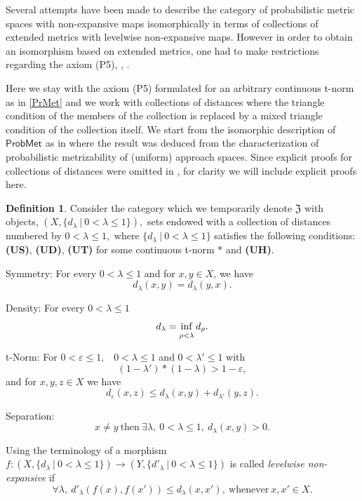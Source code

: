 \documentclass[12pt,a4paper]{amsart}
\theoremstyle{theorem}
\theoremstyle{definition}
\newtheorem{definition}[theorem]{Definition}
\newcommand{\PM}{\ensuremath{\mathsf{ProbMet_{}}}}
\renewcommand{\inf}{\myinf}
\DeclareMathOperator*{\myinf}{in\vphantom{p}f}
\newcommand{\ve}{\ensuremath{\varepsilon}}
\renewcommand{\l}{\ensuremath{\lambda}}
\def\rw{\rightarrow}
\begin{document}
{Several attempts have been made to describe the category of probabilistic metric spaces with non-expansive maps isomorphically in terms of collections of extended metrics with levelwise non-expansive maps.  However in order to obtain an isomorphism based on extended metrics, one had to make restrictions regarding the axiom (P5), \cite{SS}, \cite{N}.

Here we stay with the axiom (P5) formulated for an arbitrary continuous t-norm as in \eqref{PrMet} and we work with collections of distances where the triangle condition of the members of the collection is replaced by a mixed triangle condition of the 
collection itself. 
We start from the isomorphic description of $\PM$ as in \cite{CL2} where the result was deduced from the characterization of probabilistic metrizability of (uniform) approach spaces. Since explicit proofs for collections of distances were omitted in \cite{CL2}, for clarity we will include explicit proofs here.


\begin{definition}\label{Z}
Consider the category which we temporarily denote $\mathfrak{Z}$ with objects, $(X, \{d_\l \ | \ 0< \l \leq 1\}),$ sets endowed with a collection of distances numbered by $ 0< \l \leq 1,$ where $\{d_\l \ | \ 0< \l \leq 1\}$
satisfies the following conditions: {\bf(US)}, {\bf(UD)}, {\bf(UT)}  for some continuous t-norm $*$  and {\bf(UH)}.\\

\item [{\bf(US)}] Symmetry: For every $0 < \l \leq 1$ and for $x,y \in X$, we have 
$$d_\l (x, y) = d_\l (y, x).$$
\item [{\bf(UD)}] Density:  For every $0 < \l \leq 1$ 
$$
d_\l = \inf _{\rho < \l} d_\rho.
$$ 
\item[{\bf(UT)}] t-Norm: For $0< \ve \leq 1,$ \ $0 < \l \leq 1$ and $0 < \l' \leq 1$ with 
$$
 (1 - \l') * ( 1 - \l) > 1 - \ve,
$$
 and for $x,y,z \in X$ we have
$$
d_\ve(x, z) \leq d_\l(x, y) + d_{\l'}(y, z).
$$
\item [{\bf(UH)}] Separation:
$$
x \not = y \ \text{then} \  \exists\l, \  0 < \l \leq 1, \ d_\l (x,y) > 0.
$$


Using the terminology of \cite{CL2} a morphism  $f : (X, \{d_\l \ | \ 0< \l \leq 1\}) \rw (Y, \{d'_\l \ | \ 0< \l \leq 1\})$ is called \emph{levelwise non-expansive}  if
\begin{equation}\label{morphisms}
\forall \l, \  d'_\l(f(x), f(x')) \leq d_\l (x,x'), \ \text{whenever} \ x, x' \in X.
\end{equation}
\end{definition}

}
\end{document}
